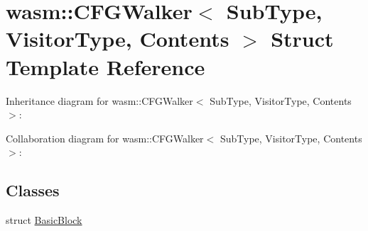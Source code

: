 \hypertarget{structwasm_1_1_c_f_g_walker}{}\section{wasm\+:\+:C\+F\+G\+Walker$<$ Sub\+Type, Visitor\+Type, Contents $>$ Struct Template Reference}
\label{structwasm_1_1_c_f_g_walker}


Inheritance diagram for wasm\+:\+:C\+F\+G\+Walker$<$ Sub\+Type, Visitor\+Type, Contents $>$\+:


Collaboration diagram for wasm\+:\+:C\+F\+G\+Walker$<$ Sub\+Type, Visitor\+Type, Contents $>$\+:
\subsection*{Classes}
\begin{DoxyCompactItemize}
\item 
struct \mbox{\hyperlink{structwasm_1_1_c_f_g_walker_1_1_basic_block}{Basic\+Block}}
\end{DoxyCompactItemize}
